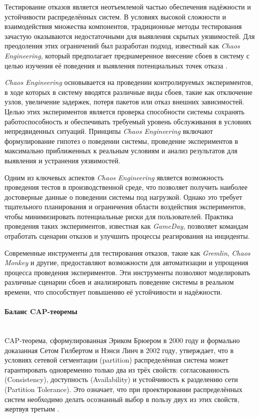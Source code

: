 Тестирование отказов является неотъемлемой частью обеспечения надёжности и устойчивости распределённых систем. В условиях высокой сложности и взаимодействия множества компонентов, традиционные методы тестирования зачастую оказываются недостаточными для выявления скрытых уязвимостей. Для преодоления этих ограничений был разработан подход, известный как \textit{Chaos Engineering}, который предполагает преднамеренное внесение сбоев в систему с целью изучения её поведения и выявления потенциальных точек отказа \autocite{GremlinChaosEngineering}.

\textit{Chaos Engineering} основывается на проведении контролируемых экспериментов, в ходе которых в систему вводятся различные виды сбоев, такие как отключение узлов, увеличение задержек, потеря пакетов или отказ внешних зависимостей. Целью этих экспериментов является проверка способности системы сохранять работоспособность и обеспечивать требуемый уровень обслуживания в условиях непредвиденных ситуаций. Принципы \textit{Chaos Engineering} включают формулирование гипотез о поведении системы, проведение экспериментов в максимально приближенных к реальным условиям и анализ результатов для выявления и устранения уязвимостей.

Одним из ключевых аспектов \textit{Chaos Engineering} является возможность проведения тестов в производственной среде, что позволяет получить наиболее достоверные данные о поведении системы под нагрузкой. Однако это требует тщательного планирования и ограничения области воздействия экспериментов, чтобы минимизировать потенциальные риски для пользователей. Практика проведения таких экспериментов, известная как \textit{GameDay}, позволяет командам отработать сценарии отказов и улучшить процессы реагирования на инциденты.

Современные инструменты для тестирования отказов, такие как \textit{Gremlin}, \textit{Chaos Monkey} и другие, предоставляют возможности для автоматизации и упрощения процесса проведения экспериментов. Эти инструменты позволяют моделировать различные сценарии сбоев и анализировать поведение системы в реальном времени, что способствует повышению её устойчивости и надёжности.

\paragraph{Баланс CAP-теоремы} ~\\

CAP-теорема, сформулированная Эриком Брюером в 2000 году и формально доказанная Сетом Гилбертом и Нэнси Линч в 2002 году, утверждает, что в условиях сетевой сегментации (partition) распределённая система может гарантировать одновременно только два из трёх свойств: согласованность (Consistency), доступность (Availability) и устойчивость к разделению сети (Partition Tolerance). Это означает, что при проектировании распределённых систем необходимо делать осознанный выбор в пользу двух из этих свойств, жертвуя третьим \autocite{CAPTheoremGeeks}.

